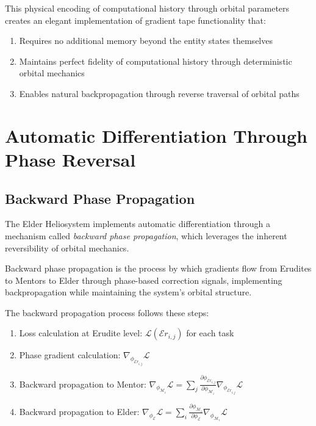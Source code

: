 This physical encoding of computational history through orbital parameters creates an elegant implementation of gradient tape functionality that:

\begin{enumerate}
    \item Requires no additional memory beyond the entity states themselves
    \item Maintains perfect fidelity of computational history through deterministic orbital mechanics
    \item Enables natural backpropagation through reverse traversal of orbital paths
\end{enumerate}

\section{Automatic Differentiation Through Phase Reversal}

\subsection{Backward Phase Propagation}

The Elder Heliosystem implements automatic differentiation through a mechanism called \textit{backward phase propagation}, which leverages the inherent reversibility of orbital mechanics.

\begin{definition}
Backward phase propagation is the process by which gradients flow from Erudites to Mentors to Elder through phase-based correction signals, implementing backpropagation while maintaining the system's orbital structure.
\end{definition}

The backward propagation process follows these steps:

\begin{enumerate}
    \item Loss calculation at Erudite level: $\mathcal{L}(\mathcal{E}r_{i,j})$ for each task
    \item Phase gradient calculation: $\nabla_{\phi_{\mathcal{E}r_{i,j}}} \mathcal{L}$
    \item Backward propagation to Mentor: $\nabla_{\phi_{\mathcal{M}_i}} \mathcal{L} = \sum_j \frac{\partial \phi_{\mathcal{E}r_{i,j}}}{\partial \phi_{\mathcal{M}_i}} \nabla_{\phi_{\mathcal{E}r_{i,j}}} \mathcal{L}$
    \item Backward propagation to Elder: $\nabla_{\phi_{\mathcal{E}}} \mathcal{L} = \sum_i \frac{\partial \phi_{\mathcal{M}_i}}{\partial \phi_{\mathcal{E}}} \nabla_{\phi_{\mathcal{M}_i}} \mathcal{L}$
\end{enumerate}

